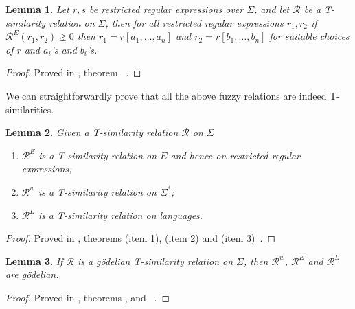 \documentclass{article}
\newcommand{\cR}{{\mathcal R}}
\newtheorem{lemma}{Lemma}[section]
\begin{document}
\begin{lemma} Let $r,s$ be restricted regular expressions over $\Sigma$, and let $\mathcal{R}$ be a T-similarity relation on $\Sigma$, then for all restricted regular expressions $r_1,r_2$ if $\mathcal{R}^E(r_1,r_2)\gneq 0$ then $r_1=r[a_1,\ldots,a_n] $ and $r_2=r[b_1,\ldots,b_n] $ for suitable choices of $r$ and $a_i$'s and $b_i$'s.
\end{lemma}
\begin{proof}
\begin{sloppypar}\raggedright
Proved in , theorem
~\cite{OurRocqRepo}.
\end{sloppypar}
\end{proof}

We can straightforwardly prove that all the above fuzzy relations are indeed T-similarities.
\begin{lemma} \label{T-similarity}Given a T-similarity relation $\mathcal R$ on $\Sigma$ \begin{enumerate}
\item $\mathcal{R}^{E}$ is a T-similarity relation on $E$ and hence on restricted regular expressions;
\item $\mathcal{R}^w$ is a T-similarity relation on $\Sigma^*$;
\item$\mathcal R^L$ is a T-similarity relation on languages.
\end{enumerate}
\end{lemma}
\begin{proof}
\begin{sloppypar}\raggedright
Proved in , theorems
 (item 1),  (item 2) and
 (item 3)~\cite{OurRocqRepo}.
\end{sloppypar}
\end{proof}

{\begin{lemma}\label{lem:godelian-transfer}
If $\cR$ is a g\"odelian T-similarity relation on $\Sigma$, then $\cR^w$, $\cR^E$ and $\cR^L$ are g\"odelian.
\end{lemma}}
\begin{proof}
\begin{sloppypar}\raggedright
Proved in , theorems
,  and ~\cite{OurRocqRepo}.
\end{sloppypar}
\end{proof}
\end{document}
